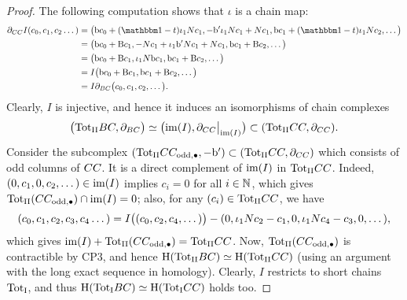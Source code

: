 \documentclass[\MainFolder/Text.tex]{subfiles}
\begin{document}
\begin{proof}
The following computation shows that $\iota$ is a chain map:
\begin{align*}
\Bdd_{\LodCycBi}I(c_0,c_1,c_2\dotsc)&= \bigl(\Hd c_0 + (\Id-\CycPermOp)\InsOneOp_1\CountOp c_1, - \Hd'\InsOneOp_1\CountOp c_1 + \CountOp c_1, \Hd c_1 + (\Id-\CycPermOp)\InsOneOp_1 \CountOp c_2, \dotsc \bigr)\\
&= \bigl(\Hd c_0 + \Cd c_1, -\CountOp c_1 + \InsOneOp_1 \Hd' \CountOp c_1 + \CountOp c_1 ,\Hd c_1 + \Cd c_2,\dotsc\bigr) \\
&= \bigl(\Hd c_0 + \Cd c_1, \InsOneOp_1 \CountOp \Hd c_1,\Hd c_1 + \Cd c_2,\dotsc\bigr) \\
&= I\bigl(\Hd c_0 + \Cd c_1, \Hd c_1 + \Cd c_2, \dotsc \bigr) \\ 
&= I\Bdd_{\ConCycBi}\bigl(c_0,c_1,c_2,\dotsc\bigr).
\end{align*}
Clearly, $I$ is injective, and hence it induces an isomorphisms of chain complexes 
\[ \bigl(\TotII\ConCycBi,\Bdd_{\ConCycBi}\bigr) \simeq \bigl(\im(I),\Restr{\Bdd_{\LodCycBi}}{\im(I)}\bigr)\subset (\TotII \LodCycBi, \Bdd_{\LodCycBi}). \]
Consider the subcomplex $({\mathrm{Tot}_{\mathrm{II}}} CC_{\mathrm{odd},\bullet},-{\mathrm{b}'})\subset ({\mathrm{Tot}_{\mathrm{II}}}CC,\partial_{CC})$ which consists of odd columns of $CC$. It is a direct complement of $\operatorname{im}(I)$ in ${\mathrm{Tot}_{\mathrm{II}}} CC$. Indeed, $(0,c_1,0,c_2,\dotsc) \in \operatorname{im}(I)$ implies $c_i = 0$ for all $i\in\mathbb{N}$, which gives ${\mathrm{Tot}_{\mathrm{II}}}(CC_{\mathrm{odd},\bullet}) \cap \operatorname{im}(I) = 0$; also, for any $(c_i)\in {\mathrm{Tot}_{\mathrm{II}}} CC$, we have
\[ (c_0, c_1, c_2, c_3, c_4 \dotsc ) = I\bigl((c_0, c_2, c_4, \dotsc )\bigr) - (0,\iota_1N c_2 - c_1 , 0, \iota_1N c_4 - c_3, 0, \dotsc), \]
which gives $\operatorname{im}(I) + {\mathrm{Tot}_{\mathrm{II}}}(CC_{\mathrm{odd},\bullet}) = {\mathrm{Tot}_{\mathrm{II}}} CC$. Now, ${\mathrm{Tot}_{\mathrm{II}}}(CC_{\mathrm{odd},\bullet})$ is contractible by CP3, and hence $\mathrm{H}({\mathrm{Tot}_{\mathrm{II}}} BC) \simeq \mathrm{H}({\mathrm{Tot}_{\mathrm{II}}} CC)$ (using an argument with the long exact sequence in homology). Clearly, $I$ restricts to short chains ${\mathrm{Tot}_{\mathrm{I}}}$, and thus $\mathrm{H}({\mathrm{Tot}_{\mathrm{I}}} BC) \simeq \mathrm{H}({\mathrm{Tot}_{\mathrm{I}}} CC)$ holds too.


\end{proof}
\end{document}

